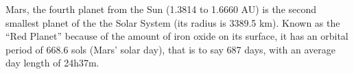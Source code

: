 Mars, the fourth planet from the Sun (1.3814 to 1.6660 AU) is the second smallest planet of the the Solar System (its radius is 3389.5 km). Known as the ``Red Planet'' because of the amount of iron oxide on its surface, it has an orbital period of 668.6 sols (Mars' solar day), that is to say 687 days, with an average day length of 24h37m.